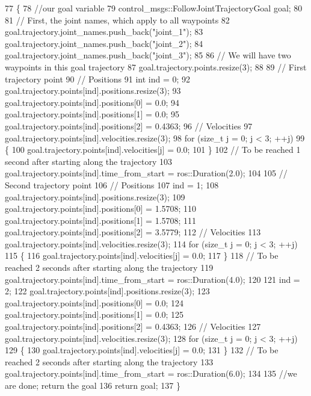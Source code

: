 \begin{DoxyCode}
77     \{
78       \textcolor{comment}{//our goal variable}
79       control\_msgs::FollowJointTrajectoryGoal goal;
80 
81       \textcolor{comment}{// First, the joint names, which apply to all waypoints}
82       goal.trajectory.joint\_names.push\_back(\textcolor{stringliteral}{"joint\_1"});
83       goal.trajectory.joint\_names.push\_back(\textcolor{stringliteral}{"joint\_2"});
84       goal.trajectory.joint\_names.push\_back(\textcolor{stringliteral}{"joint\_3"});
85 
86       \textcolor{comment}{// We will have two waypoints in this goal trajectory}
87       goal.trajectory.points.resize(3);
88 
89       \textcolor{comment}{// First trajectory point}
90       \textcolor{comment}{// Positions}
91       \textcolor{keywordtype}{int} ind = 0;
92       goal.trajectory.points[ind].positions.resize(3);
93       goal.trajectory.points[ind].positions[0] = 0.0;
94       goal.trajectory.points[ind].positions[1] = 0.0;
95       goal.trajectory.points[ind].positions[2] = 0.4363;
96       \textcolor{comment}{// Velocities}
97       goal.trajectory.points[ind].velocities.resize(3);
98       \textcolor{keywordflow}{for} (\textcolor{keywordtype}{size\_t} j = 0; j < 3; ++j)
99       \{
100         goal.trajectory.points[ind].velocities[j] = 0.0;
101       \}
102       \textcolor{comment}{// To be reached 1 second after starting along the trajectory}
103       goal.trajectory.points[ind].time\_from\_start = ros::Duration(2.0);
104 
105       \textcolor{comment}{// Second trajectory point}
106       \textcolor{comment}{// Positions}
107       ind = 1;
108       goal.trajectory.points[ind].positions.resize(3);
109       goal.trajectory.points[ind].positions[0] = 1.5708;
110       goal.trajectory.points[ind].positions[1] = 1.5708;
111       goal.trajectory.points[ind].positions[2] = 3.5779;
112       \textcolor{comment}{// Velocities}
113       goal.trajectory.points[ind].velocities.resize(3);
114       \textcolor{keywordflow}{for} (\textcolor{keywordtype}{size\_t} j = 0; j < 3; ++j)
115       \{
116         goal.trajectory.points[ind].velocities[j] = 0.0;
117       \}
118       \textcolor{comment}{// To be reached 2 seconds after starting along the trajectory}
119       goal.trajectory.points[ind].time\_from\_start = ros::Duration(4.0);
120 
121       ind = 2;
122       goal.trajectory.points[ind].positions.resize(3);
123       goal.trajectory.points[ind].positions[0] = 0.0;
124       goal.trajectory.points[ind].positions[1] = 0.0;
125       goal.trajectory.points[ind].positions[2] = 0.4363;
126       \textcolor{comment}{// Velocities}
127       goal.trajectory.points[ind].velocities.resize(3);
128       \textcolor{keywordflow}{for} (\textcolor{keywordtype}{size\_t} j = 0; j < 3; ++j)
129       \{
130         goal.trajectory.points[ind].velocities[j] = 0.0;
131       \}
132       \textcolor{comment}{// To be reached 2 seconds after starting along the trajectory}
133       goal.trajectory.points[ind].time\_from\_start = ros::Duration(6.0);
134 
135       \textcolor{comment}{//we are done; return the goal}
136       \textcolor{keywordflow}{return} goal;
137     \}
\end{DoxyCode}
